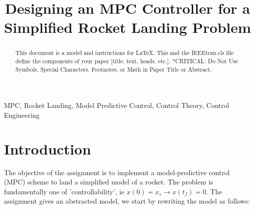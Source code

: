 \documentclass[conference, tikz]{IEEEtran}
\begin{document}
\title{Designing an MPC Controller for a Simplified Rocket Landing Problem}
\author{

}

\maketitle

\begin{abstract}
This document is a model and instructions for \LaTeX.
This and the IEEEtran.cls file define the components of your paper [title, text, heads, etc.]. *CRITICAL: Do Not Use Symbols, Special Characters, Footnotes, 
or Math in Paper Title or Abstract.
\end{abstract}

\begin{IEEEkeywords}
MPC, Rocket Landing, Model Predictive Control, Control Theory, Control Engineering
\end{IEEEkeywords}

\section{Introduction}
The objective of the assignment is to implement a model-predictive control (MPC) scheme to land a simplified model of a rocket. 
The problem is fundamentally one of 'controllability', ie $x(0) = x_s \rightarrow x(t_f) = 0$. 
The assignment gives an abstracted model, we start by rewriting the model as follows:
\end{document}
